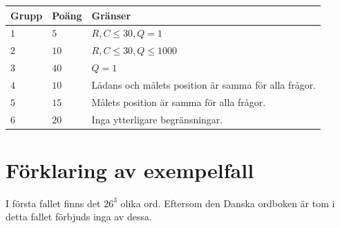 \noindent
\begin{tabular}{| l | l | p{12cm} |}
  \hline
  \textbf{Grupp} & \textbf{Poäng} & \textbf{Gränser} \\ \hline
  $1$    & $5$        & $R, C \leq 30, Q=1$ \\ \hline
  $2$    & $10$       & $R, C \leq 30, Q \leq 1000$ \\ \hline
  $3$    & $40$       & $Q=1$ \\ \hline
  $4$    & $10$       & Lådans och målets position är samma för alla frågor. \\ \hline
  $5$    & $15$       & Målets position är samma för alla frågor. \\ \hline
  $6$    & $20$       & Inga ytterligare begränsningar. \\ \hline
\end{tabular}

\section*{Förklaring av exempelfall}
I första fallet finns det $26^3$ olika ord. Eftersom den Danska ordboken är tom i detta fallet förbjuds inga av dessa.
